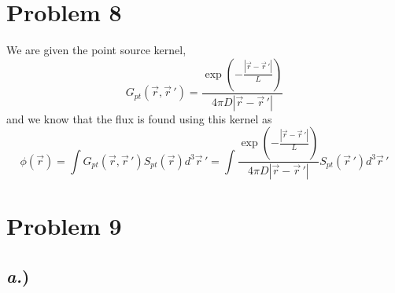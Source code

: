 \documentclass{article}
\newcommand{\pos}{\vec{r}}
\begin{document}

\section*{Problem 8}

We are given the point source kernel, 
$$ G_{pt}(\pos,\pos\,') = \frac{\exp\left(-\frac{|\pos-\pos\,'|}{L}\right)}{4\pi D |\pos-\pos\,'|}$$
and we know that the flux is found using this kernel as
$$ \phi(\pos) = \int G_{pt}(\pos,\pos\,') S_{pt}(\pos) d^3\pos\,' = \int \frac{\exp\left(-\frac{|\pos-\pos\,'|}{L}\right)}{4\pi D |\pos-\pos\,'|} S_{pt}(\pos\,') d^3\pos\,' $$




\section*{Problem 9}

\subsection*{\textit{a.})}
\end{document}

